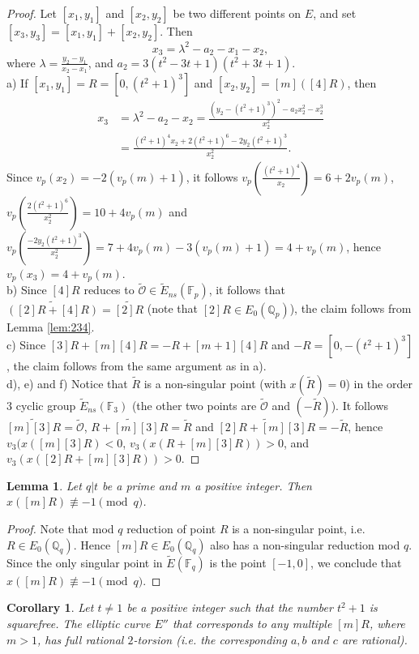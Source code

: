 \documentclass[11pt]{amsart}
\theoremstyle{plain}
\newtheorem{lemma}{Lemma}
\newtheorem{corollary}{Corollary}
\theoremstyle{remark}
\begin{document}
\begin{proof}
Let $[x_1,y_1]$ and $[x_2, y_2]$ be two different points on $E$, and set %
$[x_3,y_3]=[x_1,y_1]+[x_2,y_2]$. Then
$$x_3 = \lambda^2-a_2-x_1-x_2,$$
where $\lambda=\frac{y_2-y_1}{x_2-x_1}$, and $a_2= 3(t^2-3t+1)(t^2+3t+1)$.
\\
a) If $[x_1, y_1]=R=[0, (t^2+1)^3]$ and $[x_2,y_2]=[m]([4]R)$, then
\begin{align*}
x_3&=\lambda^2-a_2-x_2=\frac{(y_2-(t^2+1)^3)^2-a_2x_2^2-x_2^3}{x_2^2}\\
   &= \frac{(t^2+1)^4x_2+2(t^2+1)^6-2y_2(t^2+1)^3}{x_2^2}.
\end{align*}
Since $v_p(x_2)=-2(v_p(m)+1)$, it follows $v_p(\frac{(t^2+1)^4}{x_2})=6+2v_p(m)$, $v_p(\frac{2(t^2+1)^6}{x_2^2})=10+4v_p(m)$ and $v_p(\frac{-2y_2(t^2+1)^3}{x_2^2})=7+4v_p(m)-3(v_p(m)+1)=4+v_p(m)$, hence $v_p(x_3)=4+v_p(m)$.
\\
b) Since $[4]R$ reduces to $\tilde{\mathcal{O}} \in \tilde{E}_{ns}(\mathbb{F}_p)$, it follows that $\widetilde{([2]R+[4]R)}=\widetilde{[2]R}$ (note that $[2]R\in E_0(\mathbb{Q}_p)$), the claim follows from Lemma \ref{lem:234}.
\\
c) Since $[3]R+[m][4]R=-R+[m+1][4]R$ and $-R=[0,-(t^2+1)^3]$, the claim follows from the same argument as in a).
\\
d), e) and f) Notice that $\tilde{R}$ is a non-singular point (with $x(\tilde{R})=0$) in the order $3$ cyclic group $\tilde{E}_{ns}(\mathbb{F}_3)$ (the other two points are $\tilde{\mathcal{O}}$ and $(-\tilde{R})$). It follows $\widetilde{[m][3]R}=\tilde{\mathcal{O}}$,  $\widetilde{R+[m][3]R}=\tilde{R}$ and  $\widetilde{[2]R+[m][3]R}=-\tilde{R}$, hence $v_3(x([m][3]R)<0$, $v_3(x(R+[m][3]R)) > 0$, and $v_3(x([2]R+[m][3]R)) > 0$.
\end{proof}

\begin{lemma}
\label{lem:t}
Let $q|t$ be a prime and $m$ a positive integer. Then $x([m]R)\not \equiv -1 \pmod{q}$.
\end{lemma}

\begin{proof}
Note that mod $q$ reduction of point $R$ is a non-singular point, i.e. $R\in E_0(\mathbb{Q}_q)$. Hence $[m]R\in E_0(\mathbb{Q}_q)$ also has a non-singular reduction mod $q$. Since the only singular point in $\tilde{E}(\mathbb{F}_q)$ is the point $[-1,0]$, we conclude that $x([m]R)\not \equiv -1 \pmod{q}$.
\end{proof}

\begin{corollary}
\label{cor:integers}
Let  $t \ne 1$ be a positive integer such that the number $t^2+1$ is squarefree.
The elliptic curve $E''$ that corresponds to any multiple  $[m]R$, where $m>1$, has full rational $2$-torsion (i.e. the corresponding $a,b$ and $c$ are rational).
\end{corollary}
\end{document}
